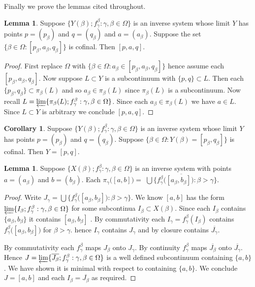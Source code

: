 \documentclass[12pt]{article}
\theoremstyle{plain}
\theoremstyle{definition}
\newtheorem{corollary}[theorem]{Corollary}
\newcounter{dummy}
\newtheorem{lmma}[dummy]{Lemma}
\newcounter{dummy4}
\newcounter{dummy3}
\newcounter{dummy5}
\newcounter{dummy6}
\newcommand{\B}{\ensuremath{\beta}}
\newcommand{\WW}{\ensuremath{\Omega}}
\newcommand{\G}{\ensuremath{\gamma}}
\newcommand{\0}{\ensuremath{\varnothing}}
\begin{document}
	
	Finally we prove the lemmas cited throughout.
	
	\begin{lmma}\label{betlim}
		Suppose $\{Y(\B); f^\B_\G: \G,\B \in \WW\}$ is an inverse system
		whose limit $Y$ has points $p = (p_\B)$ and  $q = (q_\B)$ and $a = (a_\B)$.
		Suppose the set $\big \{\B \in \WW: [p_\B, a_\B, q_\B] \big \}$ is cofinal.
		Then $[p,a,q]$.
	\end{lmma}
	
	\begin{proof}
		First replace $\WW$ with $\big \{\B \in \WW: a_\B \in [p_\B, a_\B, q_\B] \big \}$ hence assume each $[p_\B, a_\B, q_\B]$.
		Now suppose $L \subset Y$ is a subcontinuum with $\{p,q\} \subset L$.
		Then each $\{p_\B,q_\B\} \subset \pi_\B(L)$ and so $a_\B \in \pi_\B(L)$ since $\pi_\B(L)$ is a subcontinuum.
		Now recall $L = \varprojlim \{\pi_\B(L);f^\B_\G: \G,\B \in \WW\}$.
		Since each $a_\B \in \pi_\B(L)$ we have $a \in L $.
		Since $L \subset Y$ is arbitrary we conclude $[p,a,q]$.
	\end{proof}
	
	
	\begin{corollary}\label{irred}
		Suppose $\{Y(\B); f^\B_\G: \G,\B \in \WW\}$ is an inverse system 
		whose limit $Y$ has points $p = (p_\B)$ and $q = (q_\B)$. 
		Suppose $\big \{\B \in \WW: Y(\B) = [p_\B,q_\B] \big \}$ is cofinal.
		Then $Y=[p,q]$.
	\end{corollary}
	
	
	\begin{lmma} \label{liminterval}
		Suppose $\{X(\B); f^\B_\G: \G,\B \in \WW\}$ is an inverse system with points $a= (a_\B)$ and $b = (b_\B)$. 
		Each $\pi_\G \big ( [a,b] \big ) = $ $\overline { \bigcup \big \{f^\B_\G\big ( [a_\B,b_\B] \big ): \B > \G \big \}}$.
	\end{lmma}
	
	\begin{proof}
		Write $J_\G = \bigcup \big \{f^\B_\G\big ( [a_\B,b_\B] \big ): \B > \G\big \}$.
		We know $[a,b]$ has the form 
		$\varprojlim \{I_\B;f^\B_\G: \G,\B \in \WW\}$ for some subcontinua $I_\B \subset X(\B)$.
		Since each $I_\B$ contains $\{a_\B,b_\B\}$ it contains $[a_\B,b_\B]$ .
		By commutativity each $I_\G = f^\B_\G(I_\B)$ contains $f^\B_\G\big ( [a_\B,b_\B] \big )$ for $\B> \G$.
		hence $ I_\G$ contains $J_\G$ and by closure contains $\overline {J_\G}$.
		
		By commutativity each $f^\B_\G$ maps $J_\B$ onto $J_\G$.
		By continuity $f^\B_\G$ maps $\overline {J_\B}$ onto $\overline{J_\G}$.
		Hence $J = \varprojlim \{\overline{J_\B};f^\B_\G: \G,\B \in \WW\}$ is a well defined subcontinuum containing $\{a,b\}$.
		We have shown it is minimal with respect to containing $\{a,b\}$.
		We conclude $J = [a,b]$ and each $I_\B = \overline{J_\B}$ as required.
	\end{proof}
	
\end{document}
